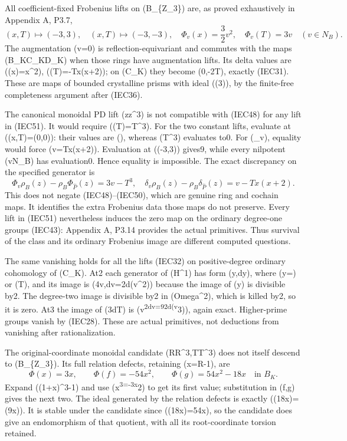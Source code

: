 \documentclass[
]{article}
\begin{document}
All coefficient-fixed Frobenius lifts on (B\_\{\mathbb Z\_3\}) are, as
proved exhaustively in Appendix A, P3.7, \[
(x,T)\mapsto(-3,3),\quad(x,T)\mapsto(-3,-3),\quad
\Phi_v(x)=\frac32v^2,\quad\Phi_v(T)=3v\quad(v\in N_B).
\tag{IEC51}
\] The augmentation (v=0) is reflection-equivariant and commutes with
the maps (B\_K\to C\_K\to D\_K) when those rings have augmentation
lifts. Its delta values are (\delta(x)=x\^{}2), (\delta(T)=-Tx(x+2)); on
(C\_K) they become (0,-2\epsilon T), exactly (IEC31). These are maps of
bounded crystalline prisms with ideal ((3)), by the finite-free
completeness argument after (IEC36).

The canonical monoidal PD lift (z\mapsto z\^{}3) is not compatible with
(IEC48) for any lift in (IEC51). It would require (\Phi(T)=T\^{}3). For
the two constant lifts, evaluate at ((x,T)=(0,0)): their values are
(), whereas (T\^{}3) evaluates to0. For (\Phi\_v), equality would
force (v=Tx(x+2)). Evaluation at ((-3,3)) gives9, while every nilpotent
(v\in N\_B) has evaluation0. Hence equality is impossible. The exact
discrepancy on the specified generator is \[
\Phi_v\rho_B(z)-\rho_B\Phi_{\widehat P}(z)
=3v-T^3,
\quad
\delta_v\rho_B(z)-\rho_B\delta_{\widehat P}(z)
=v-Tx(x+2).
\tag{IEC52}
\] This does not negate (IEC48)--(IEC50), which are genuine ring and
cochain maps. It identifies the extra Frobenius data those maps do not
preserve. Every lift in (IEC51) nevertheless induces the zero map on the
ordinary degree-one groups (IEC43): Appendix A, P3.14 provides the
actual primitives. Thus survival of the class and its ordinary Frobenius
image are different computed questions.

The same vanishing holds for all the lifts (IEC32) on positive-degree
ordinary cohomology of (C\_K). At2 each generator of (H\^{}1) has form
(y,dy), where (y=\epsilon) or (T), and its image is (4v,dv=2d(v\^{}2))
because the image of (y) is divisible by2. The degree-two image is
divisible by2 in (Omega\^{}2), which is killed by2, so it is zero. At3
the image of (3\epsilon dT) is
(v\textsuperscript{2dv=\frac92d(v}3)), again exact.
Higher-prime groups vanish by (IEC28). These are actual primitives, not
deductions from vanishing after rationalization.

The original-coordinate monoidal candidate
(R\mapsto R\^{}3,T\mapsto T\^{}3) does not itself descend to
(B\_\{\mathbb Z\_3\}). Its full relation defects, retaining (x=R-1), are
\[
\Phi(x)=3x,\qquad
\Phi(f)=-54x^2,\qquad \Phi(g)=54x^2-18x
\quad\text{in }B_K.
\tag{IEC56}
\] Expand ((1+x)\^{}3-1) and use (x\textsuperscript{3=-3x}2) to get its
first value; substitution in (f,g) gives the next two. The ideal
generated by the relation defects is exactly ((18x)=(9x)). It is stable
under the candidate since (\Phi(18x)=54x), so the candidate does give an
endomorphism of that quotient, with all its root-coordinate torsion
retained.
\end{document}

